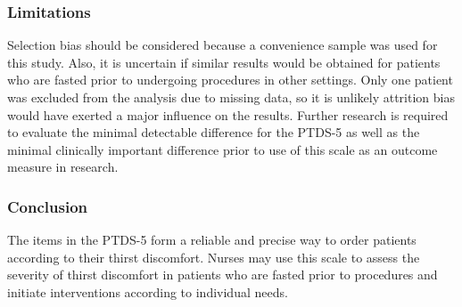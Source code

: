\documentclass[letterpaper,9pt,twocolumn,twoside,]{pinp}
\begin{document}
\hypertarget{limitations}{%
\subsubsection{Limitations}\label{limitations}}

Selection bias should be considered because a convenience sample was
used for this study. Also, it is uncertain if similar results would be
obtained for patients who are fasted prior to undergoing procedures in
other settings. Only one patient was excluded from the analysis due to
missing data, so it is unlikely attrition bias would have exerted a
major influence on the results. Further research is required to evaluate
the minimal detectable difference for the PTDS-5 as well as the minimal
clinically important difference prior to use of this scale as an outcome
measure in research.

\hypertarget{conclusion-1}{%
\subsubsection{Conclusion}\label{conclusion-1}}

The items in the PTDS-5 form a reliable and precise way to order
patients according to their thirst discomfort. Nurses may use this scale
to assess the severity of thirst discomfort in patients who are fasted
prior to procedures and initiate interventions according to individual
needs.
\end{document}
